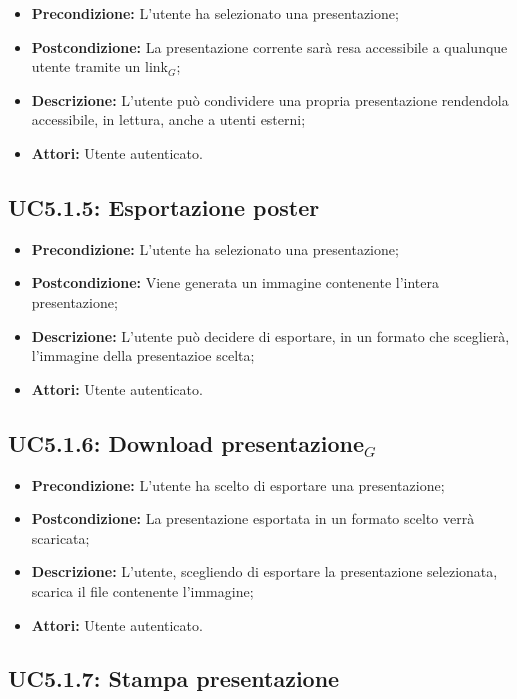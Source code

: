 \begin{itemize}
	\item \textbf{Precondizione:} L'utente ha selezionato una presentazione;
	\item \textbf{Postcondizione:} La presentazione corrente sarà resa accessibile a qualunque utente tramite un link$_G$;
	\item \textbf{Descrizione:} L'utente può condividere una propria presentazione rendendola accessibile, in lettura, anche a utenti esterni;
	\item \textbf{Attori:} Utente autenticato.
\end{itemize}
\subsection{ UC5.1.5: Esportazione poster}

\begin{itemize}
	\item \textbf{Precondizione:} L'utente ha selezionato una presentazione;
	\item \textbf{Postcondizione:} Viene generata un immagine contenente l'intera presentazione;
	\item \textbf{Descrizione:} L'utente può decidere di esportare, in un formato che sceglierà, l'immagine della presentazioe scelta;
	\item \textbf{Attori:} Utente autenticato.
\end{itemize}
\subsection{ UC5.1.6: Download presentazione$_G$}

\begin{itemize}
	\item \textbf{Precondizione:} L'utente ha scelto di esportare una presentazione;
	\item \textbf{Postcondizione:} La presentazione esportata in un formato scelto verrà scaricata;
	\item \textbf{Descrizione:} L'utente, scegliendo di esportare la presentazione selezionata, scarica il file contenente l'immagine;
	\item \textbf{Attori:} Utente autenticato.
\end{itemize}
\subsection{ UC5.1.7: Stampa presentazione }

